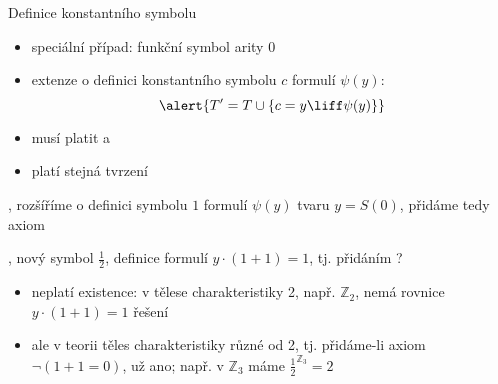 \documentclass{beamer}
\begin{document}
\begin{frame}{Definice konstantního symbolu}
    
    \begin{itemize}
        \item \alert{speciální případ:} funkční symbol arity $0$\pause 
        \item extenze o definici konstantního symbolu $c$ formulí $\psi(y)$:\pause
        $$
        \alert{T'=T\cup\{c=y\liff \psi(y)\}}
        $$
        
        \pause
        \item musí platit  a \pause 
        \item platí stejná tvrzení
    \end{itemize}

    \pause 
    , rozšíříme o definici symbolu $1$ formulí $\psi(y)$ tvaru \alert{$y=S(0)$}, přidáme tedy axiom 

    \pause 
    , nový symbol $\frac{1}{2}$, definice formulí \alert{$y\cdot (1+1)=1$}, tj. přidáním 
        ?\pause 
        \begin{itemize}
            \item {} neplatí existence: v tělese \alert{charakteristiky 2}, např. $\mathbb Z_2$, nemá rovnice $y\cdot (1+1)=1$ řešení\pause 
            \item ale v teorii těles \alert{charakteristiky různé od 2}, tj. přidáme-li axiom $\neg (1+1=0)$, už ano; např. v $\mathbb Z_3$ máme $\frac{1}{2}^{\mathbb Z_3}=2$
        \end{itemize}        

\end{frame}
\end{document}
